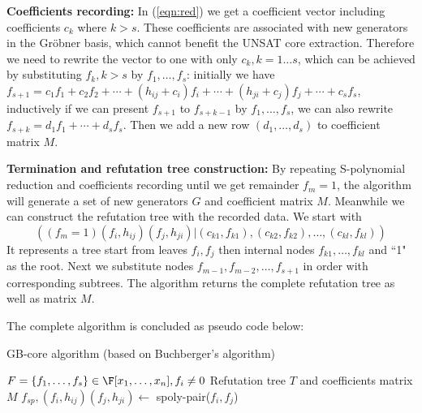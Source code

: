 {\bf Coefficients recording:} In (\ref{eqn:red}) we get a coefficient vector including coefficients
$c_k$ where $k>s$. These coefficients are associated with new generators in the Gr\"obner basis,
which cannot benefit the UNSAT core extraction. Therefore we need to rewrite the vector to
one with only $c_k, k=1\dots s$, which can be achieved by substituting $f_k,k>s$ by $f_1,\dots,f_s$:
initially we have $f_{s+1}= c_1f_1 + c_2f_2 + \cdots + (h_{ij}+c_i)f_{i}+\cdots+(h_{ji}+c_j)f_{j}+\cdots+c_sf_s$,
inductively if we can present $f_{s+1}$ to $f_{s+k-1}$ by $f_1,\dots,f_s$, we can also rewrite
$f_{s+k} = d_1f_1+\cdots+d_sf_s$. Then we add a new row $ (d_1,\dots,d_s ) $ to coefficient matrix $M$.

{\bf Termination and refutation tree construction:} By repeating S-polynomial reduction and coefficients 
recording until we get remainder $f_m = 1$, the algorithm
will generate a set of new generators $G$ and coefficient matrix $M$.
Meanwhile we can construct the refutation tree with the recorded data.
We start with 
\begin{displaymath}
((f_{m}=1)(f_{i},h_{ij})(f_{j},h_{ji})| (c_{k1},f_{k1}),(c_{k2},f_{k2}),\dots,(c_{kl},f_{kl}))
\end{displaymath}
It represents a tree start from leaves $f_{i}, f_j$ then internal nodes $f_{k1},\dots,f_{kl}$
and ``1" as the root. Next we substitute nodes $f_{m-1}, f_{m-2}, \dots, f_{s+1}$ in order
with corresponding subtrees. The algorithm returns the complete refutation tree as well as
matrix $M$.

The complete algorithm is concluded as pseudo code below:

\begin{algorithm}[H]
 \caption{GB-core algorithm (based on Buchberger's algorithm)}
 \label{algo:gbcore}
 \begin{algorithmic}[1]

 \REQUIRE $F = \{f_1, \dots, f_s\} \in \F[x_1, \dots, x_n], f_i\neq 0$
 \ENSURE Refutation tree $T$ and coefficients matrix $M$
 	\STATE  $f_{sp},(f_{i},h_{ij})(f_{j},h_{ji}) \gets$ spoly-pair($f_i,f_j$) 
 	\ENDIF
 	\ENDIF
 \ENDFOR
 \end{algorithmic}
 \end{algorithm}
